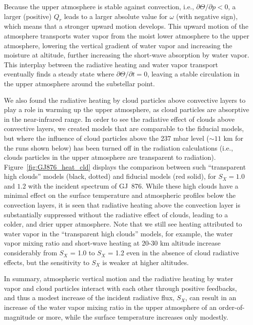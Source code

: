 \documentclass[11pt,numberedappendix,twocolappendix,]{emulateapj}
\def\wv{water vapor}
\begin{document}
Because the upper atmosphere is stable against convection, i.e., $\partial \Theta / \partial p < 0 $, a larger (positive) $Q_r$ leads to a larger absolute value for $\omega $ (with negative sign), which means that a stronger upward motion develops. 
This upward motion of the atmosphere transports water vapor from the moist lower atmosphere to the upper atmosphere, lowering the vertical gradient of water vapor and increasing the moisture at altitude, further increasing the short-wave absorption by \wv{}. 
This interplay between the radiative heating and water vapor transport eventually finds a steady state where $\partial \Theta/\partial t = 0$, leaving a stable circulation in the upper atmosphere around the substellar point. 

We also found the radiative heating by cloud particles above convective layers to play a role in warming up the upper atmosphere, as cloud particles are absorptive in the near-infrared range. 
In order to see the radiative effect of clouds above convective layers, we created models that are comparable to the fiducial models, but where the  influence of cloud particles above the 237 mbar level ($\sim 11$ km for the runs shown below) has been turned off in the radiation calculations (i.e., clouds particles in the upper atmosphere are transparent to radiation). 
Figure~\ref{fig:GJ876_heat_cld} displays the comparison between such ``transparent high clouds'' models (black, dotted) and fiducial models (red solid), for $S_X=1.0$ and $1.2$ with the incident spectrum of GJ~876. 
While these high clouds have a minimal effect on the surface temperature and atmospheric profiles below the convection layers, it is seen that radiative heating above the convection layer is substantially suppressed without the radiative effect of clouds, leading to a colder, and drier upper atmosphere. 
Note that we still see heating attributed to water vapor in the ``transparent high clouds'' models, for example, the \wv{} mixing ratio and short-wave heating at 20-30 km altitude increase considerably from $S_X$ = 1.0 to $S_X$ = 1.2 even in the absence of cloud radiative effects, but the sensitivity to $S_X$ is weaker at higher altitudes. 

In summary, atmospheric vertical motion and the radiative heating by water vapor and cloud particles interact with each other through positive feedbacks, and thus a modest increase of the incident radiative flux, $S_X$, can result in  an increase of the \wv{} mixing ratio in the upper atmosphere of an order-of-magnitude or more, while the surface temperature increases only modestly. 
\end{document}
